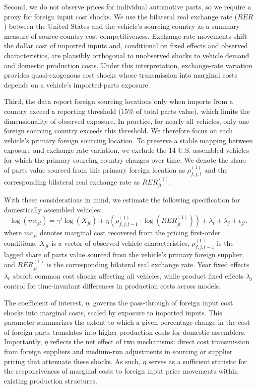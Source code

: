 \documentclass[11pt]{article}
\begin{document}
Second, we do not observe prices for individual automotive parts, so we require a proxy for foreign input cost shocks. We use the bilateral real exchange rate ($RER$) between the United States and the vehicle’s sourcing country as a summary measure of source-country cost competitiveness. Exchange-rate movements shift the dollar cost of imported inputs and, conditional on fixed effects and observed characteristics, are plausibly orthogonal to unobserved shocks to vehicle demand and domestic production costs. Under this interpretation, exchange-rate variation provides quasi-exogenous cost shocks whose transmission into marginal costs depends on a vehicle’s imported-parts exposure.

Third, the data report foreign sourcing locations only when imports from a country exceed a reporting threshold (15\% of total parts value), which limits the dimensionality of observed exposure. In practice, for nearly all vehicles, only one foreign sourcing country exceeds this threshold. We therefore focus on each vehicle’s primary foreign sourcing location. To preserve a stable mapping between exposure and exchange-rate variation, we exclude the 14 U.S.-assembled vehicles for which the primary sourcing country changes over time. We denote the share of parts value sourced from this primary foreign location as $\rho^{(1)}_{f,j,t}$ and the corresponding bilateral real exchange rate as $RER^{(1)}_{jt}$.

With these considerations in mind, we estimate the following specification for domestically assembled vehicles:
\begin{equation}\label{eq:costEst}
\log(mc_{jt}) = \gamma' \log(X_{jt})
+ \eta \left( \rho^{(1)}_{f,j,t-1} \cdot \log(RER^{(1)}_{jt}) \right)
+ \lambda_t + \lambda_j + \epsilon_{jt},
\end{equation}
where $mc_{jt}$ denotes marginal cost recovered from the pricing first-order conditions, $X_{jt}$ is a vector of observed vehicle characteristics, $\rho^{(1)}_{f,j,t-1}$ is the lagged share of parts value sourced from the vehicle’s primary foreign supplier, and $RER^{(1)}_{jt}$ is the corresponding bilateral real exchange rate. Year fixed effects $\lambda_t$ absorb common cost shocks affecting all vehicles, while product fixed effects $\lambda_j$ control for time-invariant differences in production costs across models.

The coefficient of interest, $\eta$, governs the pass-through of foreign input cost shocks into marginal costs, scaled by exposure to imported inputs. This parameter summarizes the extent to which a given percentage change in the cost of foreign parts translates into higher production costs for domestic assemblers. Importantly, $\eta$ reflects the net effect of two mechanisms: direct cost transmission from foreign suppliers and medium-run adjustments in sourcing or supplier pricing that attenuate these shocks. As such, $\eta$ serves as a sufficient statistic for the responsiveness of marginal costs to foreign input price movements within existing production structures.
\end{document}
